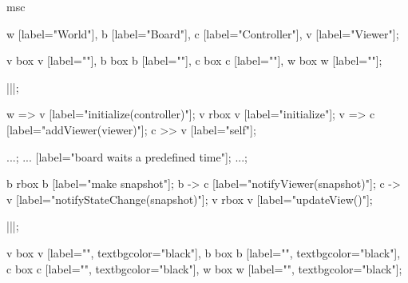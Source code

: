 \begin{msc}
msc
{

w [label="World"],
b [label="Board"],
c [label="Controller"],
v [label="Viewer"];

v box v [label=""],
b box b [label=""],
c box c [label=""],
w box w [label=""];

|||;

w => v [label="initialize(controller)"];
v rbox v [label="initialize"];
v => c [label="addViewer(viewer)"];
c >> v [label="self"];

...;
... [label="board waits a predefined time"];
...;

b rbox b [label="make snapshot"];
b -> c [label="notifyViewer(snapshot)"];
c -> v [label="notifyStateChange(snapshot)"];
v rbox v [label="updateView()"];

|||;

v box v [label="", textbgcolor="black"],
b box b [label="", textbgcolor="black"],
c box c [label="", textbgcolor="black"],
w box w [label="", textbgcolor="black"];

}
\end{msc}
